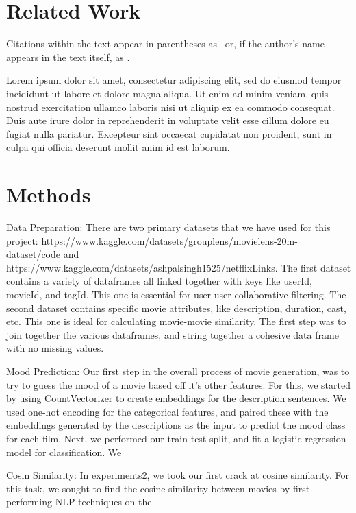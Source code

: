 \documentclass[11pt,a4paper]{article}
\begin{document}
\section{Related Work}

Citations within the text appear in parentheses as~\citep{aho1972theory} or, if the author's name appears in the text itself, as \citet{andrew2007scalable}.



Lorem ipsum dolor sit amet, consectetur adipiscing elit, sed do eiusmod tempor incididunt ut labore et dolore magna aliqua. Ut enim ad minim veniam, quis nostrud exercitation ullamco laboris nisi ut aliquip ex ea commodo consequat. Duis aute irure dolor in reprehenderit in voluptate velit esse cillum dolore eu fugiat nulla pariatur. Excepteur sint occaecat cupidatat non proident, sunt in culpa qui officia deserunt mollit anim id est laborum.


\section{Methods}

Data Preparation:
There are two primary datasets that we have used for this project: https://www.kaggle.com/datasets/grouplens/movielens-20m-dataset/code and https://www.kaggle.com/datasets/ashpalsingh1525/netflixLinks. The first dataset contains a variety of dataframes all linked together with keys like userId, movieId, and tagId.
This one is essential for user-user collaborative filtering. The second dataset contains specific movie attributes, like description, duration, cast, etc. This one is ideal for calculating movie-movie similarity. The first step was to join together the various dataframes, and string together a cohesive data frame with 
no missing values.

Mood Prediction:
Our first step in the overall process of movie generation, was to try to guess the mood of a movie based off it's other features. For this, we started by using CountVectorizer to create embeddings for the description sentences. We used one-hot encoding for the categorical features, and paired these with the embeddings generated by the descriptions as the input to predict the mood class for each film.
Next, we performed our train-test-split, and fit a logistic regression model for classification. We 

Cosin Similarity:
In experiments2, we took our first crack at cosine similarity. For this task, we sought to find the cosine similarity between movies by first performing NLP techniques on the 
\end{document}
